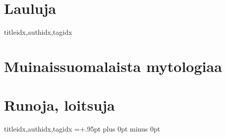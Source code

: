     \begin{otherlanguage}{finnish} %
      \section{Lauluja}
        \begin{songs}{titleidx,authidx,tagidx}
          
          
        \end{songs}
      \clearpage\scleardpage
      \section{Muinaissuomalaista mytologiaa}
        
      \clearpage\scleardpage
      \section{Runoja, loitsuja}
        \begin{songs}{titleidx,authidx,tagidx}
          \chordsoff %
          \baselineadj=+.95pt plus 0pt minus 0pt %
          \renewcommand{\lyricfont}{\small} %
          
          \renewcommand{\lyricfont}{\defaultlyricfont} %
          \baselineadj=0pt %
          \chordson %
        \end{songs}
    \end{otherlanguage}

